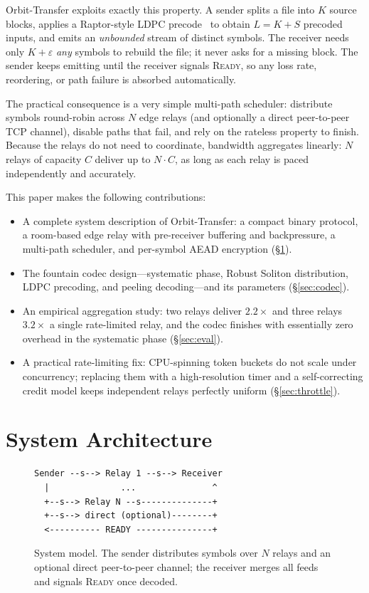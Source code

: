 \documentclass[conference]{IEEEtran}
\begin{document}
Orbit-Transfer exploits exactly this property. A sender splits a file into $K$
source blocks, applies a Raptor-style LDPC precode~\cite{shokrollahi2006raptor}
to obtain $L=K+S$ precoded inputs, and emits an \emph{unbounded} stream of
distinct symbols. The receiver needs only $K+\varepsilon$ \emph{any} symbols to
rebuild the file; it never asks for a missing block. The sender keeps emitting
until the receiver signals \textsc{Ready}, so any loss rate, reordering, or
path failure is absorbed automatically.

The practical consequence is a very simple multi-path scheduler: distribute
symbols round-robin across $N$ edge relays (and optionally a direct peer-to-peer
TCP channel), disable paths that fail, and rely on the rateless property to
finish. Because the relays do not need to coordinate, bandwidth aggregates
linearly: $N$ relays of capacity $C$ deliver up to $N\cdot C$, as long as each
relay is paced independently and accurately.

This paper makes the following contributions:
\begin{itemize}
\item A complete system description of Orbit-Transfer: a compact binary
protocol, a room-based edge relay with pre-receiver buffering and backpressure,
a multi-path scheduler, and per-symbol AEAD encryption (\S\ref{sec:arch}).
\item The fountain codec design---systematic phase, Robust Soliton
distribution, LDPC precoding, and peeling decoding---and its parameters
(\S\ref{sec:codec}).
\item An empirical aggregation study: two relays deliver $2.2\times$ and three
relays $3.2\times$ a single rate-limited relay, and the codec finishes with
essentially zero overhead in the systematic phase (\S\ref{sec:eval}).
\item A practical rate-limiting fix: CPU-spinning token buckets do not scale
under concurrency; replacing them with a high-resolution timer and a
self-correcting credit model keeps independent relays perfectly uniform
(\S\ref{sec:throttle}).
\end{itemize}

\section{System Architecture}
\label{sec:arch}

\begin{figure}[!t]
\centering
\scriptsize
\begin{minipage}{0.95\columnwidth}
\begin{verbatim}
Sender --s--> Relay 1 --s--> Receiver
  |              ...               ^
  +--s--> Relay N --s--------------+
  +--s--> direct (optional)--------+
  <---------- READY ---------------+
\end{verbatim}
\end{minipage}
\caption{System model. The sender distributes symbols over $N$ relays and an
optional direct peer-to-peer channel; the receiver merges all feeds and signals
\textsc{Ready} once decoded.}
\label{fig:system}
\end{figure}
\end{document}
